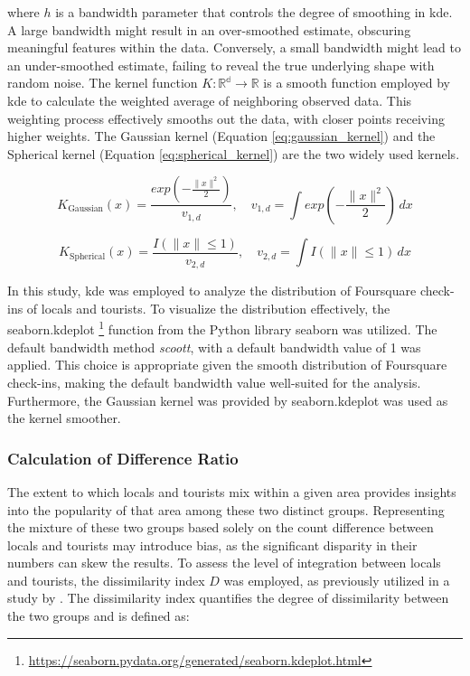 \documentclass{article}
\begin{document}
where $h$ is a bandwidth parameter that controls the degree of smoothing in \acrshort{kde}. A large bandwidth might result in an over-smoothed estimate, obscuring meaningful features within the data. Conversely, a small bandwidth might lead to an under-smoothed estimate, failing to reveal the true underlying shape with random noise. The kernel function $K: \mathbb{R^{d}} \rightarrow \mathbb{R}$ is a smooth function employed by \acrshort{kde} to calculate the weighted average of neighboring observed data. This weighting process effectively smooths out the data, with closer points receiving higher weights. The Gaussian kernel (Equation \ref{eq:gaussian_kernel}) and the Spherical kernel (Equation \ref{eq:spherical_kernel}) are the two widely used kernels.

\begin{equation} \label{eq:gaussian_kernel}
K_{\text{Gaussian}}(x) = \frac{exp\left(-\frac{\|x\|^{2}}{2}\right)}{v_{1,d}}, \quad v_{1,d} = \int exp\left(-\frac{\|x\|^{2}}{2}\right) \, dx 
\end{equation}

\begin{equation} \label{eq:spherical_kernel}
K_{\text{Spherical}}(x) = \frac{I\left(\|x\| \leq 1\right)}{v_{2,d}}, \quad v_{2,d} = \int I\left(\|x\| \leq 1\right) \, dx 
\end{equation}

In this study, \acrshort{kde} was employed to analyze the distribution of Foursquare check-ins of locals and tourists. To visualize the distribution effectively, the seaborn.kdeplot \footnote{\url{https://seaborn.pydata.org/generated/seaborn.kdeplot.html}} function from the Python library seaborn was utilized. The default bandwidth method \textit{scoott}, with a default bandwidth value of 1 was applied. This choice is appropriate given the smooth distribution of Foursquare check-ins, making the default bandwidth value well-suited for the analysis. Furthermore, the Gaussian kernel was provided by seaborn.kdeplot was used as the kernel smoother.

\subsubsection{Calculation of Difference Ratio}
The extent to which locals and tourists mix within a given area provides insights into the popularity of that area among these two distinct groups. Representing the mixture of these two groups based solely on the count difference between locals and tourists may introduce bias, as the significant disparity in their numbers can skew the results. To assess the level of integration between locals and tourists, the dissimilarity index $D$ was employed, as previously utilized in a study by \cite{li_analyzing_2018}. The dissimilarity index quantifies the degree of dissimilarity between the two groups and is defined as:
\end{document}
